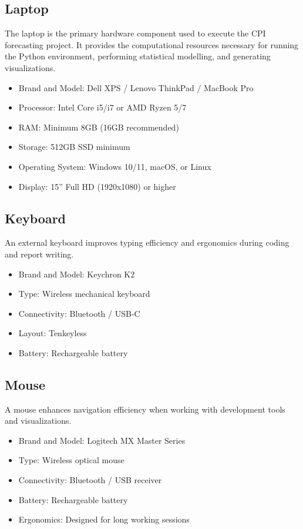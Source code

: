 \subsection{Laptop}

The laptop is the primary hardware component used to execute the CPI forecasting project. 
It provides the computational resources necessary for running the Python environment, 
performing statistical modelling, and generating visualizations.

\begin{itemize}
	\item Brand and Model: Dell XPS / Lenovo ThinkPad / MacBook Pro
	\item Processor: Intel Core i5/i7 or AMD Ryzen 5/7
	\item RAM: Minimum 8GB (16GB recommended)
	\item Storage: 512GB SSD minimum
	\item Operating System: Windows 10/11, macOS, or Linux
	\item Display: 15'' Full HD (1920x1080) or higher
\end{itemize}

\subsection{Keyboard}

An external keyboard improves typing efficiency and ergonomics during coding and report writing.

\begin{itemize}
	\item Brand and Model: Keychron K2
	\item Type: Wireless mechanical keyboard
	\item Connectivity: Bluetooth / USB-C
	\item Layout: Tenkeyless
	\item Battery: Rechargeable battery
\end{itemize}

\subsection{Mouse}

A mouse enhances navigation efficiency when working with development tools and visualizations.

\begin{itemize}
	\item Brand and Model: Logitech MX Master Series
	\item Type: Wireless optical mouse
	\item Connectivity: Bluetooth / USB receiver
	\item Battery: Rechargeable battery
	\item Ergonomics: Designed for long working sessions
\end{itemize}

